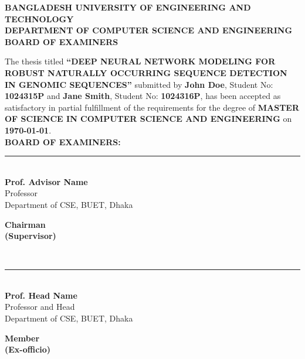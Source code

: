 \begin{titlepage}
\begin{center}
    \vspace*{0.5cm}
    
    {\large \bfseries BANGLADESH UNIVERSITY OF ENGINEERING AND TECHNOLOGY}\\[0.2cm]
    {\large \bfseries DEPARTMENT OF COMPUTER SCIENCE AND ENGINEERING}\\[1.5cm]
    
    {\large \bfseries BOARD OF EXAMINERS}\\[1.0cm]
    
\end{center}

\noindent The thesis titled \textbf{``DEEP NEURAL NETWORK MODELING FOR ROBUST NATURALLY OCCURRING SEQUENCE DETECTION IN GENOMIC SEQUENCES''} submitted by \textbf{John Doe}, Student No: \textbf{1024315P} and \textbf{Jane Smith}, Student No: \textbf{1024316P}, has been accepted as satisfactory in partial fulfillment of the requirements for the degree of \textbf{MASTER OF SCIENCE IN COMPUTER SCIENCE AND ENGINEERING} on \textbf{\today}.\\[2.0cm]

\noindent \textbf{BOARD OF EXAMINERS:}\\[2.0cm]

\noindent\begin{minipage}[t]{0.5\textwidth}
    \rule{7cm}{0.5pt}\\
    \textbf{Prof. Advisor Name}\\
    Professor\\
    Department of CSE, BUET, Dhaka
\end{minipage}
\begin{minipage}[t]{0.4\textwidth}
    \hfill \textbf{Chairman}\\
    \hfill \textbf{(Supervisor)}
\end{minipage}\\[2.5cm]

\noindent\begin{minipage}[t]{0.5\textwidth}
    \rule{7cm}{0.5pt}\\
    \textbf{Prof. Head Name}\\
    Professor and Head\\
    Department of CSE, BUET, Dhaka
\end{minipage}
\begin{minipage}[t]{0.4\textwidth}
    \hfill \textbf{Member}\\
    \hfill \textbf{(Ex-officio)}
\end{minipage}\\[2.5cm]


\end{titlepage}
